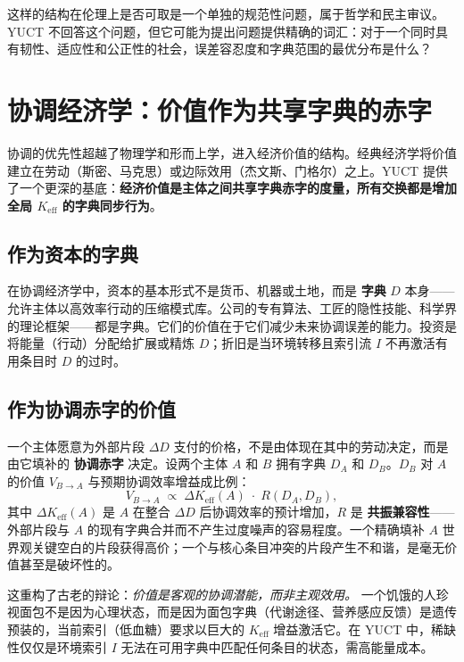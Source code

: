 \documentclass[12pt,a4paper]{article}
\newcommand{\Keff}{K_{\mathrm{eff}}}
\begin{document}
	这样的结构在伦理上是否可取是一个单独的规范性问题，属于哲学和民主审议。YUCT 不回答这个问题，但它可能为提出问题提供精确的词汇：对于一个同时具有韧性、适应性和公正性的社会，误差容忍度和字典范围的最优分布是什么？
	
	\section{协调经济学：价值作为共享字典的赤字}
	\label{sec:coordination-economics}
	
	协调的优先性超越了物理学和形而上学，进入经济价值的结构。经典经济学将价值建立在劳动（斯密、马克思）或边际效用（杰文斯、门格尔）之上。YUCT 提供了一个更深的基底：\textbf{经济价值是主体之间共享字典赤字的度量，所有交换都是增加全局 $K_{\mathrm{eff}}$ 的字典同步行为}。
	
	\subsection{作为资本的字典}
	
	在协调经济学中，资本的基本形式不是货币、机器或土地，而是 \textbf{字典} $D$ 本身——允许主体以高效率行动的压缩模式库。公司的专有算法、工匠的隐性技能、科学界的理论框架——都是字典。它们的价值在于它们减少未来协调误差的能力。投资是将能量（行动）分配给扩展或精炼 $D$；折旧是当环境转移且索引流 $I$ 不再激活有用条目时 $D$ 的过时。
	
	\subsection{作为协调赤字的价值}
	
	一个主体愿意为外部片段 $\Delta D$ 支付的价格，不是由体现在其中的劳动决定，而是由它填补的 \textbf{协调赤字} 决定。设两个主体 $A$ 和 $B$ 拥有字典 $D_A$ 和 $D_B$。$D_B$ 对 $A$ 的价值 $V_{B \rightarrow A}$ 与预期协调效率增益成比例：
	\[
	V_{B \rightarrow A} \; \propto \; \Delta\Keff(A) \; \cdot \; R(D_A, D_B),
	\]
	其中 $\Delta\Keff(A)$ 是 $A$ 在整合 $\Delta D$ 后协调效率的预计增加，$R$ 是 \textbf{共振兼容性}——外部片段与 $A$ 的现有字典合并而不产生过度噪声的容易程度。一个精确填补 $A$ 世界观关键空白的片段获得高价；一个与核心条目冲突的片段产生不和谐，是毫无价值甚至是破坏性的。
	
	这重构了古老的辩论：\emph{价值是客观的协调潜能，而非主观效用。} 一个饥饿的人珍视面包不是因为心理状态，而是因为面包字典（代谢途径、营养感应反馈）是遗传预装的，当前索引（低血糖）要求以巨大的 $K_{\mathrm{eff}}$ 增益激活它。在 YUCT 中，稀缺性仅仅是环境索引 $I$ 无法在可用字典中匹配任何条目的状态，需高能量成本。
	
\end{document}
